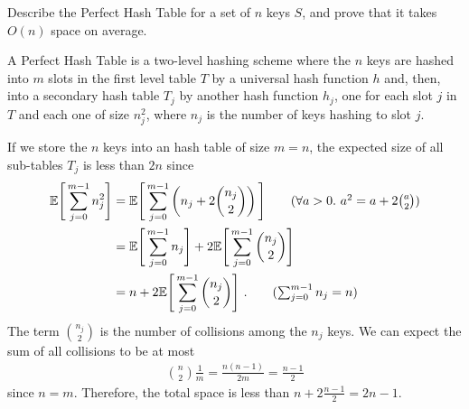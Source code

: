 \exercise

Describe the Perfect Hash Table for a set of $n$ keys $S$, and prove that it
takes $O(n)$ space on average.

\solution

A Perfect Hash Table is a two-level hashing scheme where the $n$ keys are hashed
into $m$ slots in the first level table $T$ by a universal hash function $h$
and, then, into a secondary hash table $T_j$ by another hash function $h_j$, one
for each slot $j$ in $T$ and each one of size $n_j^2$, where $n_j$ is the number
of keys hashing to slot $j$.

If we store the $n$ keys into an hash table of size $m = n$, the expected size
of all sub-tables $T_j$ is less than $2n$ since
%
\begin{align*}
  \mathbb{E}\Bigg[\sum_{j=0}^{m-1} n_j^2\Bigg] &=
  \mathbb{E}\Bigg[\sum_{j=0}^{m-1} \left(n_j + 2 {{n_j}\choose{2}}\right)\Bigg]
  \tag{$\forall a > 0.\ a^2 = a + 2{a \choose 2}$} \\ &=
  \mathbb{E}\Bigg[\sum_{j=0}^{m-1} n_j\Bigg] +
  2\mathbb{E}\Bigg[\sum_{j=0}^{m-1} {{n_j}\choose{2}}\Bigg] \\ &=
  n + 2\mathbb{E}\Bigg[\sum_{j=0}^{m-1} {{n_j}\choose{2}}\Bigg]\ .
  \tag{$\sum_{j=0}^{m-1} n_j = n$}
\end{align*}
%
The term $n_j \choose 2$ is the number of collisions among the $n_j$ keys. We
can expect the sum of all collisions to be at most
%
\begin{align*}
  {n \choose 2}\frac{1}{m} = \frac{n(n - 1)}{2m} = \frac{n - 1}{2}
\end{align*}
%
since $n = m$. Therefore, the total space is less than $n + 2\frac{n - 1}{2} =
2n - 1$.
